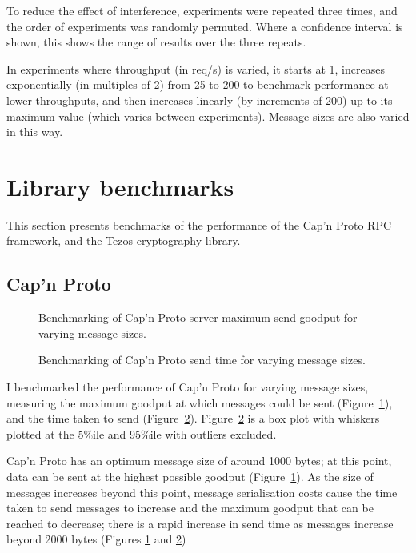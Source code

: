 To reduce the effect of interference, experiments were repeated three times, and the order of experiments was randomly permuted. Where a confidence interval is shown, this shows the range of results over the three repeats.

In experiments where throughput (in req/s) is varied, it starts at 1, increases exponentially (in multiples of 2) from 25 to 200 to benchmark performance at lower throughputs, and then increases linearly (by increments of 200) up to its maximum value (which varies between experiments). Message sizes are also varied in this way.

\section{Library benchmarks} \label{librarybenchmarks}
This section presents benchmarks of the performance of the Cap'n Proto RPC framework, and the Tezos cryptography library.

\subsection{Cap'n Proto} \label{capnpbenchmark}

\begin{figure}[h!]
\centering
\resizebox{.6\textwidth}{!}{}
\caption{Benchmarking of Cap'n Proto server maximum send goodput for varying message sizes.}
\label{sizegoodput}
\end{figure}

\begin{figure}[h!]
\centering
\resizebox{.6\textwidth}{!}{}
\caption{Benchmarking of Cap'n Proto send time for varying message sizes.}
\label{sizesendtime}
\end{figure}

I benchmarked the performance of Cap'n Proto \cite{capnp} for varying message sizes, measuring the maximum goodput at which messages could be sent (Figure~\ref{sizegoodput}), and the time taken to send (Figure~\ref{sizesendtime}). Figure~\ref{sizesendtime} is a box plot with whiskers plotted at the 5\%ile and 95\%ile with outliers excluded.

Cap'n Proto has an optimum message size of around 1000 bytes; at this point, data can be sent at the highest possible goodput (Figure~\ref{sizegoodput}). As the size of messages increases beyond this point, message serialisation costs cause the time taken to send messages to increase and the maximum goodput that can be reached to decrease; there is a rapid increase in send time as messages increase beyond 2000 bytes (Figures \ref{sizegoodput} and \ref{sizesendtime})

